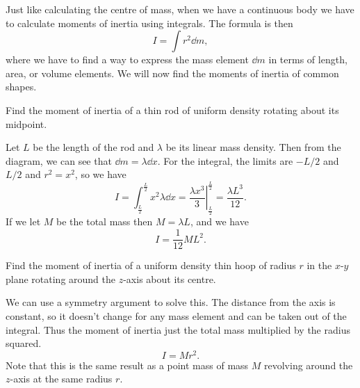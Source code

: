 \documentclass[../classical_mechanics.tex]{subfiles}
\begin{document}
        Just like calculating the centre of mass, when we have a continuous body we have to calculate moments of inertia using integrals.
        The formula is then
        \begin{equation}
            I=\int r^2\dd{m},
        \end{equation}
        where we have to find a way to express the mass element $\dd{m}$ in terms of length, area, or volume elements. 
        We will now find the moments of inertia of common shapes.
        \begin{example}
            Find the moment of inertia of a thin rod of uniform density rotating about its midpoint.
                    

            Let $L$ be the length of the rod and $\lambda$ be its linear mass density.
            Then from the diagram, we can see that $\dd{m}=\lambda\dd{x}$.
            For the integral, the limits are $-L/2$ and $L/2$ and $r^2=x^2$, so we have
            \begin{equation}
                I=\int_{\frac{L}{2}}^{\frac{L}{2}}x^2\lambda\dd{x}=\left.\frac{\lambda x^3}{3}\right|_{\frac{L}{2}}^{\frac{L}{2}}=\frac{\lambda L^3}{12}.
            \end{equation}
            If we let $M$ be the total mass then $M=\lambda L$, and we have
            \begin{equation}
                I=\frac{1}{12}ML^2.
            \end{equation}
        \end{example}
        \begin{example}
            Find the moment of inertia of a uniform density thin hoop of radius $r$ in the $x$-$y$ plane rotating around the $z$-axis about its centre.
                    

            We can use a symmetry argument to solve this.
            The distance from the axis is constant, so it doesn't change for any mass element and can be taken out of the integral.
            Thus the moment of inertia just the total mass multiplied by the radius squared.
            \begin{equation}
                I=Mr^2.
            \end{equation}
            Note that this is the same result as a point mass of mass $M$ revolving around the $z$-axis at the same radius $r$. 
        \end{example}
\end{document}
